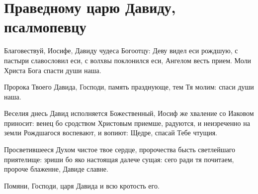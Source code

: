
\section{Праведному царю Давиду, псалмопевцу}\begin{mymulticols}


Благовествуй, Иосифе, Давиду чудеса Богоотцу: Деву видел еси рождшую, с пастыри славословил еси, с волхвы поклонился еси, Ангелом весть прием. Моли Христа Бога спасти души наша.


Пророка Твоего Давида, Господи, память празднующе, тем Тя молим: спаси души наша.


Веселия днесь Давид исполняется Божественный, Иосиф же хваление со Иаковом приносит: венец бо сродством Христовым приемше, радуются, и неизреченно на земли Рождшагося воспевают, и вопиют: Щедре, спасай Тебе чтущия.


Просветившееся Духом чистое твое сердце, пророчества бысть светлейшаго приятелище: зриши бо яко настоящая далече сущая: сего ради тя почитаем, пророче блаженне, Давиде славне.


Помяни, Господи, царя Давида и всю кротость его.



\end{mymulticols}
